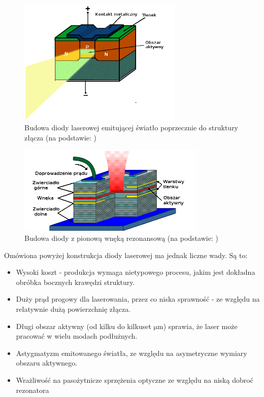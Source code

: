 \documentclass[a4paper,10pt,twoside]{report}
\begin{document}
\begin{figure}
\begin{center}
 \includegraphics[width=0.7\textwidth]{./obrazki/rys-eel.png}
\end{center}
\caption{Budowa diody laserowej emitującej światło poprzecznie do struktury złącza (na podstawie: \cite{rys-laserki})}
\label{rys-eel}
\end{figure}


\begin{figure}
\begin{center}
 \includegraphics[width=0.8\textwidth]{./obrazki/rys-vcsel.png}
\end{center}
\caption{Budowa diody z pionową wnęką rezonansową (na podstawie: \cite{rys-laserki})}
\label{rys-vcsel}
\end{figure}

Omówiona powyżej konstrukcja diody laserowej ma jednak liczne wady. Są to:
\begin{itemize}
 \item Wysoki koszt - produkcja wymaga nietypowego procesu, jakim jest dokładna obróbka bocznych krawędzi struktury.
 \item Duży prąd progowy dla laserowania, przez co niska sprawność - ze względu na relatywnie dużą powierzchnię złącza.
 \item Długi obszar aktywny (od kilku do kilkuset $\mathrm{\mu m}$) sprawia, że laser może pracować w wielu modach podłużnych.
 \item Astygmatyzm emitowanego światła, ze względu na asymetryczne wymiary obszaru aktywnego.
 \item Wrażliwość na pasożytnicze sprzężenia optyczne ze względu na niską dobroć rezonatora
\end{itemize}
\end{document}
